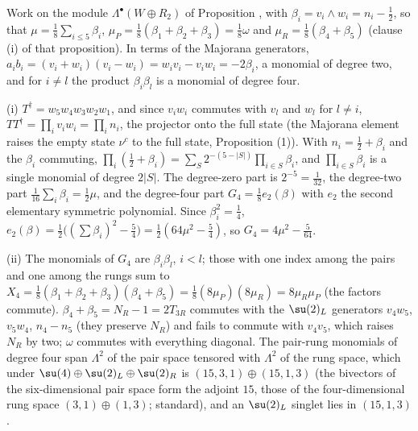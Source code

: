 Work on the module $\Lambda^{\bullet}(W \oplus R_{2})$ of Proposition , with $\beta_{i} = v_{i}\wedge w_{i} = n_{i} - \tfrac12$, so that $\mu = \tfrac18\sum_{i \le 5}\beta_{i}$, $\mu_{P} = \tfrac18(\beta_{1} + \beta_{2} + \beta_{3}) = \tfrac18\omega$ and $\mu_{R} = \tfrac18(\beta_{4} + \beta_{5})$ (clause (i) of that proposition). In terms of the Majorana generators, $a_{i}b_{i} = (v_{i} + w_{i})(v_{i} - w_{i}) = w_{i}v_{i} - v_{i}w_{i} = -2\beta_{i}$, a monomial of degree two, and for $i \ne l$ the product $\beta_{i}\beta_{l}$ is a monomial of degree four.

(i) $T^{\dagger} = w_{5}w_{4}w_{3}w_{2}w_{1}$, and since $v_{i}w_{i}$ commutes with $v_{l}$ and $w_{l}$ for $l \ne i$, $TT^{\dagger} = \prod_{i}v_{i}w_{i} = \prod_{i}n_{i}$, the projector onto the full state (the Majorana element raises the empty state $\nu^{c}$ to the full state, Proposition (1)). With $n_{i} = \tfrac12 + \beta_{i}$ and the $\beta_{i}$ commuting, $\prod_{i}(\tfrac12 + \beta_{i}) = \sum_{S}2^{-(5 - |S|)}\prod_{i \in S}\beta_{i}$, and $\prod_{i \in S}\beta_{i}$ is a single monomial of degree $2|S|$. The degree-zero part is $2^{-5} = \tfrac{1}{32}$, the degree-two part $\tfrac{1}{16}\sum_{i}\beta_{i} = \tfrac12\mu$, and the degree-four part $G_{4} = \tfrac18 e_{2}(\beta)$ with $e_{2}$ the second elementary symmetric polynomial. Since $\beta_{i}^{2} = \tfrac14$, $e_{2}(\beta) = \tfrac12\bigl((\sum\beta_{i})^{2} - \tfrac54\bigr) = \tfrac12(64\mu^{2} - \tfrac54)$, so $G_{4} = 4\mu^{2} - \tfrac{5}{64}$.

(ii) The monomials of $G_{4}$ are $\beta_{i}\beta_{l}$, $i < l$; those with one index among the pairs and one among the rungs sum to $X_{4} = \tfrac18(\beta_{1} + \beta_{2} + \beta_{3})(\beta_{4} + \beta_{5}) = \tfrac18(8\mu_{P})(8\mu_{R}) = 8\mu_{R}\mu_{P}$ (the factors commute). $\beta_{4} + \beta_{5} = N_{R} - 1 = 2T_{3R}$ commutes with the $\su(2)_{L}$ generators $v_{4}w_{5}$, $v_{5}w_{4}$, $n_{4} - n_{5}$ (they preserve $N_{R}$) and fails to commute with $v_{4}v_{5}$, which raises $N_{R}$ by two; $\omega$ commutes with everything diagonal. The pair-rung monomials of degree four span $\Lambda^{2}$ of the pair space tensored with $\Lambda^{2}$ of the rung space, which under $\su(4) \oplus \su(2)_{L} \oplus \su(2)_{R}$ is $(15,3,1) \oplus (15,1,3)$ (the bivectors of the six-dimensional pair space form the adjoint $15$, those of the four-dimensional rung space $(3,1) \oplus (1,3)$; standard), and an $\su(2)_{L}$ singlet lies in $(15,1,3)$.

